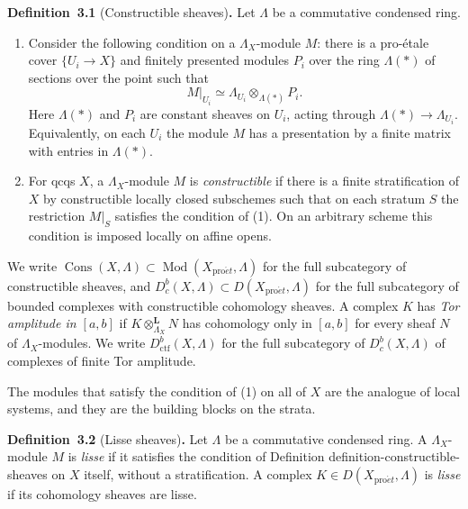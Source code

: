 \documentclass[11pt]{article}
\newenvironment{bpstatement}[2]{\par\addvspace{0.6\baselineskip}\noindent\textbf{#1}#2\textbf{.}\enspace\ignorespaces}
  {\par\addvspace{0.4\baselineskip}}
\providecommand{\Cons}{}\renewcommand{\Cons}{\operatorname{Cons}}
\providecommand{\Dbc}{}\renewcommand{\Dbc}{D^b_c}
\begin{document}
\label{bp199}%
\begin{bpstatement}{Definition~3.1}{ (Constructible sheaves)}
Let \(\Lambda\) be a commutative condensed ring.

\begin{enumerate}
\item Consider the following condition on a \(\Lambda_X\)-module \(M\): there is a pro-étale cover \(\{U_i\to X\}\) and finitely presented modules \(P_i\) over the ring \(\Lambda(*)\) of sections over the point such that \[
   M|_{U_i}\simeq\Lambda_{U_i}\otimes_{\Lambda(*)}P_i.
   \] Here \(\Lambda(*)\) and \(P_i\) are constant sheaves on \(U_i\), acting through \(\Lambda(*)\to\Lambda_{U_i}\). Equivalently, on each \(U_i\) the module \(M\) has a presentation by a finite matrix with entries in \(\Lambda(*)\).
\item For qcqs \(X\), a \(\Lambda_X\)-module \(M\) is \emph{constructible} if there is a finite stratification of \(X\) by constructible locally closed subschemes such that on each stratum \(S\) the restriction \(M|_S\) satisfies the condition of (1). On an arbitrary scheme this condition is imposed locally on affine opens.
\end{enumerate}

We write \(\Cons(X,\Lambda)\subset\operatorname{Mod}(X_{\mathrm{pro}\acute{e}t},\Lambda)\) for the full subcategory of constructible sheaves, and \(\Dbc(X,\Lambda)\subset
D(X_{\mathrm{pro}\acute{e}t},\Lambda)\) for the full subcategory of bounded complexes with constructible cohomology sheaves. A complex \(K\) has \emph{Tor amplitude in \([a,b]\)} if \(K\otimes^{\mathbf L}_{\Lambda_X}N\) has cohomology only in \([a,b]\) for every sheaf \(N\) of \(\Lambda_X\)-modules. We write \(D^b_{\mathrm{ctf}}(X,\Lambda)\) for the full subcategory of \(\Dbc(X,\Lambda)\) of complexes of finite Tor amplitude.
\end{bpstatement}

\label{bp200}%
The modules that satisfy the condition of (1) on all of \(X\) are the analogue of local systems, and they are the building blocks on the strata.

\label{bp201}%
\begin{bpstatement}{Definition~3.2}{ (Lisse sheaves)}
Let \(\Lambda\) be a commutative condensed ring. A \(\Lambda_X\)-module \(M\) is \emph{lisse} if it satisfies the condition of Definition definition-constructible-sheaves on \(X\) itself, without a stratification. A complex \(K\in D(X_{\mathrm{pro}\acute{e}t},\Lambda)\) is \emph{lisse} if its cohomology sheaves are lisse.
\end{bpstatement}
\end{document}
